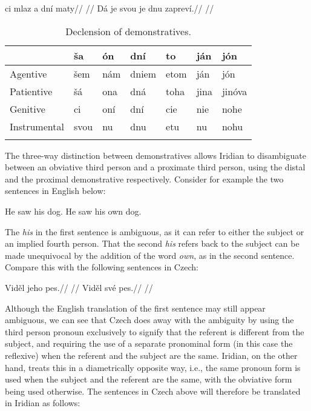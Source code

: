 \pex
\a{}
\begingl
\gla ci mlaz a dní maty//
\glft {}//
\endgl
\a{}
\begingl
\gla Dá je svou je dnu zapreví.//
\glft {}//
\endgl
\xe

\begin{table}
\footnotesize\sffamily
	\caption{Declension of demonstratives.}
    \medskip
	\begin{tabu}to \textwidth{Y[2]YYYYYY}
		\toprule
						& {ša}	& {ón}	&{dní}& {to}	& {ján}	&{jón}\\
		\midrule \addlinespace
		Agentive&šem&nám&dniem&etom&ján&jón\\\addlinespace
		Patientive&šá&ona&dná&toha&jina&jinóva\\\addlinespace
		Genitive&ci&oní&dní&cie&nie&nohe\\\addlinespace
		Instrumental&svou&nu&dnu&etu&nu&nohu\\\addlinespace
		\bottomrule
		\label{dem-conj}
	\end{tabu}
\end{table}

The three-way distinction between demonstratives allows Iridian to disambiguate between an obviative third person and a proximate third person, using the distal and the proximal demonstrative respectively. Consider for example the two sentences in English below:

\pex
\a He saw his dog.
\a He saw his own dog.\smallskip
\xe

The \emph{his} in the first sentence is ambiguous, as it can refer to either the subject or an implied fourth person. That the second \emph{his} refers back to the subject can be made unequivocal by the addition of the word \emph{own}, as in the second sentence. Compare this with the following sentences in Czech:

\begin{multicols}{2}
  \pex
  \a
  \begingl
  \gla Vid\v{e}l jeho pes.//
  \glft {}//
  \endgl
  \a \begingl
  \gla Vid\v{e}l své pes.//
  \glft {}//
  \endgl
  \xe
\end{multicols}

Although the English translation of the first sentence may still appear ambiguous, we can see that Czech does away with the ambiguity by using the third person pronoun  exclusively to signify that the referent is different from the subject, and requiring the use of a separate pronominal form (in this case the reflexive) when the referent and the subject are the same. Iridian, on the other hand, treats this in a diametrically opposite way, i.e., the same pronoun form is used when the subject and the referent are the same, with the obviative form being used otherwise. The sentences in Czech above will therefore be translated in Iridian as follows:


